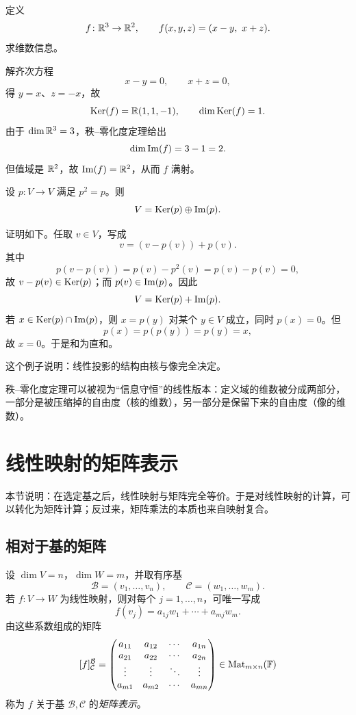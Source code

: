 \begin{example}
定义
\[
  f\colon \mathbb{R}^3\to\mathbb{R}^2,
  \qquad
  f(x,y,z)=(x-y,\ x+z).
\]
求维数信息。

解齐次方程
\[
  x-y=0,\qquad x+z=0,
\]
得 $y=x$、$z=-x$，故
\[
  \mathrm{Ker}(f)=\mathbb{R}(1,1,-1),\qquad \dim\mathrm{Ker}(f)=1.
\]
由于 $\dim\mathbb{R}^3=3$，秩--零化度定理给出
\[
  \dim\mathrm{Im}(f)=3-1=2.
\]
但值域是 $\mathbb{R}^2$，故 $\mathrm{Im}(f)=\mathbb{R}^2$，从而 $f$ 满射。
\end{example}

\begin{example}[幂等投影]
设 $p\colon V\to V$ 满足 $p^2=p$。则
\[
  V=\mathrm{Ker}(p)\oplus \mathrm{Im}(p).
\]

证明如下。任取 $v\in V$，写成
\[
  v=(v-p(v))+p(v).
\]
其中
\[
  p(v-p(v))=p(v)-p^2(v)=p(v)-p(v)=0,
\]
故 $v-p(v)\in\mathrm{Ker}(p)$；而 $p(v)\in\mathrm{Im}(p)$。因此
\[
  V=\mathrm{Ker}(p)+\mathrm{Im}(p).
\]
若 $x\in\mathrm{Ker}(p)\cap\mathrm{Im}(p)$，则 $x=p(y)$ 对某个 $y\in V$ 成立，同时 $p(x)=0$。但
\[
  p(x)=p(p(y))=p(y)=x,
\]
故 $x=0$。于是和为直和。

这个例子说明：线性投影的结构由核与像完全决定。
\end{example}

\begin{remark}
秩--零化度定理可以被视为“信息守恒”的线性版本：定义域的维数被分成两部分，一部分是被压缩掉的自由度（核的维数），另一部分是保留下来的自由度（像的维数）。
\end{remark}

\section{线性映射的矩阵表示}

本节说明：在选定基之后，线性映射与矩阵完全等价。于是对线性映射的计算，可以转化为矩阵计算；反过来，矩阵乘法的本质也来自映射复合。

\subsection{相对于基的矩阵}

\begin{definition}
设 $\dim V=n$，$\dim W=m$，并取有序基
\[
  \mathcal B=(v_1,\dots,v_n),\qquad \mathcal C=(w_1,\dots,w_m).
\]
若 $f\colon V\to W$ 为线性映射，则对每个 $j=1,\dots,n$，可唯一写成
\[
  f(v_j)=a_{1j}w_1+\cdots+a_{mj}w_m.
\]
由这些系数组成的矩阵
\[
  [f]_{\mathcal C}^{\mathcal B}
  =\begin{pmatrix} a_{11} & a_{12} & \cdots & a_{1n}\\
         a_{21} & a_{22} & \cdots & a_{2n}\\
         \vdots & \vdots & \ddots & \vdots\\
         a_{m1} & a_{m2} & \cdots & a_{mn} \end{pmatrix}
  \in \mathrm{Mat}_{m\times n}(\mathbb{F})
\]
称为 $f$ 关于基 $\mathcal B,\mathcal C$ 的\emph{矩阵表示}。
\end{definition}

